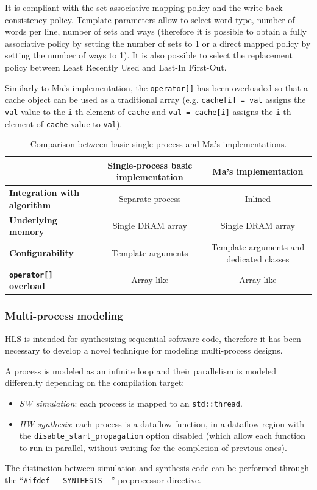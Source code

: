 \documentclass[11pt,a4paper]{memoir}
\begin{document}
It is compliant with the set associative mapping policy and the write-back
consistency policy.
Template parameters allow to select word type, number of words per line, number
of sets and ways (therefore it is possible to obtain a fully associative policy
by setting the number of sets to 1 or a direct mapped policy by setting the
number of ways to 1).
It is also possible to select the replacement policy between Least Recently Used
and Last-In First-Out.

Similarly to Ma's implementation, the \texttt{operator[]} has been overloaded
so that a cache object can be used as a traditional array (e.g.
\texttt{cache[i] = val} assigns the \texttt{val} value to the \texttt{i}-th
element of \texttt{cache} and \texttt{val = cache[i]} assigns the \texttt{i}-th
element of \texttt{cache} value to \texttt{val}).

\begin{table}
	\begin{center}
		\begin{tabularx}{\textwidth}{LCC}
			\hline
			& \textbf{Single-process basic implementation} &
			\textbf{Ma's implementation} \\
			\hline
			\textbf{Integration with algorithm} & Separate process &
			Inlined \\
			\textbf{Underlying memory} & Single DRAM array &
			Single DRAM array \\
			\textbf{Configurability} & Template arguments &
			Template arguments and dedicated classes \\
			\textbf{\texttt{operator[]} overload} & Array-like &
			Array-like \\
			\hline
		\end{tabularx}
	\end{center}
	\caption{Comparison between basic single-process and Ma's
	implementations.}
	\label{tab:basic_vs_liang}
\end{table}

\subsubsection{Multi-process modeling}
HLS is intended for synthesizing sequential software code, therefore it has
been necessary to develop a novel technique for modeling multi-process designs.

A process is modeled as an infinite loop and their parallelism is modeled
differenlty depending on the compilation target:
\begin{itemize}
	\item \emph{SW simulation}: each process is mapped to an
		\texttt{std::thread}.
	\item \emph{HW synthesis}: each process is a dataflow function, in a
		dataflow region with the \texttt{disable\_start\_propagation}
		option disabled (which allow each function to run in parallel,
		without waiting for the completion of previous ones).
\end{itemize}
The distinction between simulation and synthesis code can be performed through
the ``\texttt{\#ifdef \_\_SYNTHESIS\_\_}'' preprocessor directive.
\end{document}

